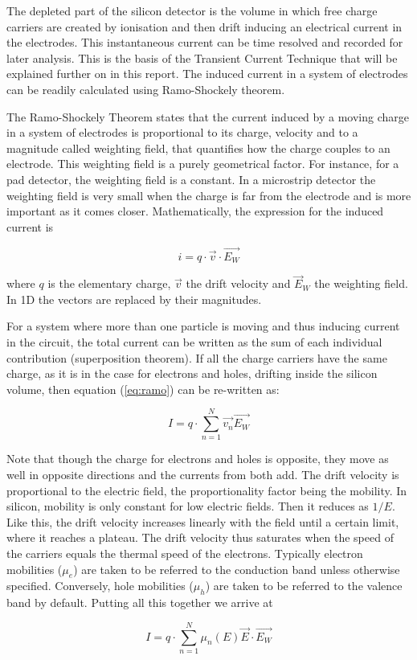 The depleted part of the silicon detector is the volume in which free
charge carriers are created by ionisation and then drift inducing an electrical
current in the electrodes. This instantaneous current can be time resolved and
recorded for later analysis. This is the basis of the Transient Current
Technique that will be explained further on in this report. The induced current
in a system of electrodes can be readily calculated using Ramo-Shockely theorem\cite{Ramo}.


The Ramo-Shockely Theorem states that the current induced by a moving charge in
a system of electrodes is proportional to its charge, velocity and to a
magnitude called weighting field, that quantifies how the charge couples to an
electrode. This weighting field is a purely geometrical factor. For instance,
for a pad detector, the weighting field is a constant. In a microstrip detector
the weighting field is very small when the charge is far from the electrode and
is more important as it comes closer. Mathematically, the expression for the
induced current is

\begin{equation}
	i = q \cdot \overrightarrow {v} \cdot \overrightarrow {E_{W}}
	\label{eq:ramo} 
\end{equation} 

where $q$ is the elementary charge, $\overrightarrow {v}$ the drift velocity and $\overrightarrow E_{W}$ the weighting
field. In 1D the vectors are replaced by their magnitudes.

For a system where more than one particle is moving and thus inducing current in
the circuit, the total current can be written as the sum of each individual
contribution (superposition theorem). If all the charge carriers have the same charge, as it is in the
case for electrons and holes, drifting inside the silicon volume, then equation
(\ref{eq:ramo}) can be re-written as:

\begin{equation}
	I = q \cdot \sum_{n=1}^{N} \overrightarrow {v_n}\overrightarrow {E_{W}} 	\label{eq:ramoTot} 
\end{equation} 

Note that though the charge for electrons and holes is opposite, they move as
well in opposite directions and the currents from both add. The drift velocity 
is proportional to the electric field, the proportionality factor being 
the mobility. In silicon, mobility is only constant for low electric fields. Then 
it reduces as $1/E$. Like this, the drift velocity increases linearly with 
the field until a certain limit, where it reaches a plateau. The drift 
velocity thus saturates when the speed of the carriers equals the thermal 
speed of the electrons. Typically electron mobilities ($ \mu_e $) are taken to 
be referred to the conduction band unless otherwise specified. Conversely, 
hole mobilities ($ \mu_h $) are taken to be referred to the valence band 
by default. Putting all this together we arrive at 

\begin{equation}
	I = q \cdot \sum_{n=1}^{N} \mu_n(E) \overrightarrow {E} \cdot \overrightarrow {E_{W}} 
\label{eq:ramoMob}
\end{equation}


